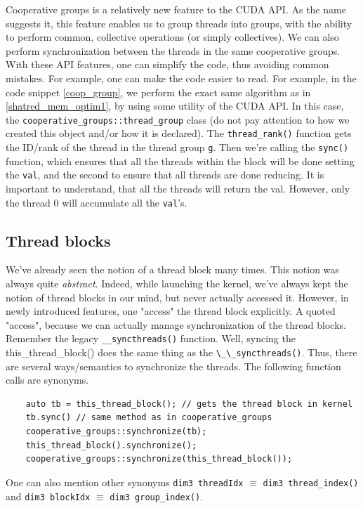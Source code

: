 \documentclass[12pt]{article}
\begin{document}
Cooperative groups is a relatively new feature to the CUDA API.
As the name suggests it, this feature enables us to group threads into groups, with the 
ability to perform common, collective operations (or simply collectives). We can also 
perform synchronization between the threads in the same cooperative groups. 
With these API features, one can simplify the code, thus avoiding common mistakes.
For example, one can make the code easier to read. For example, in the code snippet 
\autoref{coop_group}, we perform the exact same algorithm as in \autoref{shatred_mem_optim1},
by using some utility of the CUDA API. In this case, the \verb|cooperative_groups::thread_group|
class (do not pay attention to how we created this object and/or how it is declared).
The \verb|thread_rank()| function gets the ID/rank of the thread in the thread group \verb|g|.
Then we're calling the \verb|sync()| function, which ensures that all the threads within the
block will be done setting the \verb|val|, and the second to ensure that all threads are done reducing. It is important to understand, that all the threads will return the val. 
However, only the thread 0 will accumulate all the \verb|val|'s.

\subsection*{Thread blocks}
We've already seen the notion of a thread block many times. This notion was always quite \textit{abstract}. Indeed, while launching the kernel, we've 
always kept the notion of thread blocks in our mind, but never actually accessed it. However, in newly introduced features, one "access" the 
thread block explicitly. A quoted "access", because we can actually manage synchronization of the thread blocks. Remember the legacy \verb|__syncthreads()| function. 
Well, syncing the this\_thread\_block() does the same thing as the \verb|\_\_syncthreads()|. Thus, there are several ways/semantics to synchronize the threads. 
The following function calls are synonyms.
\begin{verbatim}
    auto tb = this_thread_block(); // gets the thread block in kernel
    tb.sync() // same method as in cooperative_groups
    cooperative_groups::synchronize(tb);
    this_thread_block().synchronize();
    cooperative_groups::synchronize(this_thread_block());
\end{verbatim}
One can also mention other synonyms \verb|dim3 threadIdx| $\equiv$ \verb|dim3 thread_index()| and \verb|dim3 blockIdx| $\equiv$ \verb|dim3 group_index()|.
\end{document}
